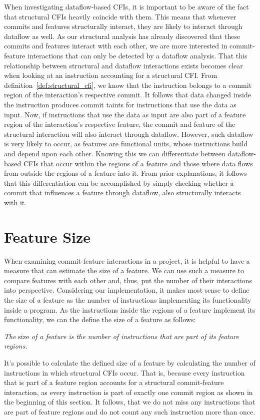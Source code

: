 When investigating dataflow-based CFIs, it is important to be aware of the fact that structural CFIs heavily coincide with them.
This means that whenever commits and features structurally interact, they are likely to interact through dataflow as well.
As our structural analysis has already discovered that these commits and features interact with each other, 
we are more interested in commit-feature interactions that can only be detected by a dataflow analysis.
That this relationship between structural and dataflow interactions exists becomes clear when looking at an instruction accounting for a structural CFI.
From definition~\ref{def:structural_cfi}, we know that the instruction belongs to a commit region of the interaction's respective commit.
It follows that data changed inside the instruction produces commit taints for instructions that use the data as input. 
Now, if instructions that use the data as input are also part of a feature region of the interaction's respective feature, the commit and feature of the structural interaction will also interact through dataflow.
However, such dataflow is very likely to occur, as features are functional units, whose instructions build and depend upon each other. 
Knowing this we can differentiate between dataflow-based CFIs that occur within the regions of a feature and those where data flows from outside the regions of a feature into it.
From prior explanations, it follows that this differentiation can be accomplished by simply checking whether a commit that influences a feature through dataflow, also structurally interacts with it. 

\section{Feature Size}\label{sec:feature_size}

When examining commit-feature interactions in a project, it is helpful to have a measure that can estimate the size of a feature.
We can use such a measure to compare features with each other and, thus, put the number of their interactions into perspective.
Considering our implementation, it makes most sense to define the size of a feature as the number of instructions implementing its functionality inside a program.
As the instructions inside the regions of a feature implement its functionality, we can the define the size of a feature as follows:
\begin{definition} \label{def:feature_size}
\emph{The} size \emph{of a feature is the number of instructions that are part of its feature regions.}
\end{definition}
It's possible to calculate the defined size of a feature by calculating the number of instructions in which structural CFIs occur.
That is, because every instruction that is part of a feature region accounts for a structural commit-feature interaction, as every instruction is part of exactly one commit region as shown in the beginning of this section.
It follows, that we do not miss any instructions that are part of feature regions and do not count any such instruction more than once. 

